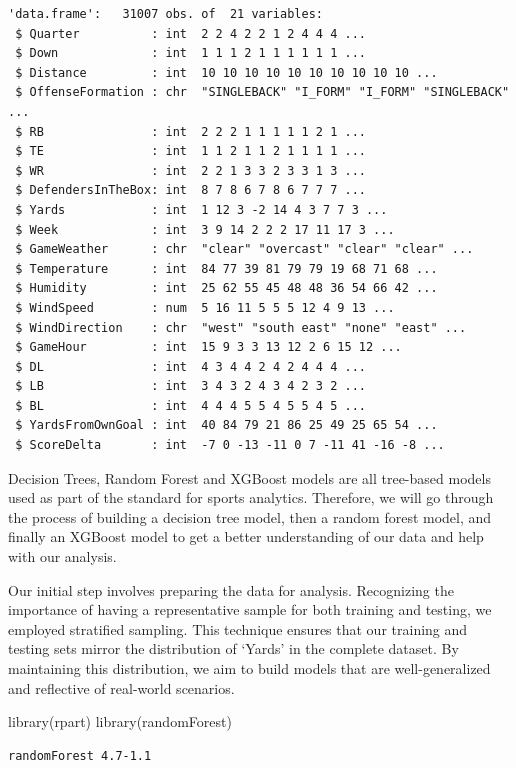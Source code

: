 \documentclass[
  super,
  preprint,
  3p]{elsarticle}
\newenvironment{Shaded}{\begin{snugshade}}{\end{snugshade}}
\newcommand{\FunctionTok}[1]{\textcolor[rgb]{0.28,0.35,0.67}{#1}}
\newcommand{\NormalTok}[1]{\textcolor[rgb]{0.00,0.23,0.31}{#1}}
\begin{document}
\begin{verbatim}
'data.frame':   31007 obs. of  21 variables:
 $ Quarter          : int  2 2 4 2 2 1 2 4 4 4 ...
 $ Down             : int  1 1 1 2 1 1 1 1 1 1 ...
 $ Distance         : int  10 10 10 10 10 10 10 10 10 10 ...
 $ OffenseFormation : chr  "SINGLEBACK" "I_FORM" "I_FORM" "SINGLEBACK" ...
 $ RB               : int  2 2 2 1 1 1 1 1 2 1 ...
 $ TE               : int  1 1 2 1 1 2 1 1 1 1 ...
 $ WR               : int  2 2 1 3 3 2 3 3 1 3 ...
 $ DefendersInTheBox: int  8 7 8 6 7 8 6 7 7 7 ...
 $ Yards            : int  1 12 3 -2 14 4 3 7 7 3 ...
 $ Week             : int  3 9 14 2 2 2 17 11 17 3 ...
 $ GameWeather      : chr  "clear" "overcast" "clear" "clear" ...
 $ Temperature      : int  84 77 39 81 79 79 19 68 71 68 ...
 $ Humidity         : int  25 62 55 45 48 48 36 54 66 42 ...
 $ WindSpeed        : num  5 16 11 5 5 5 12 4 9 13 ...
 $ WindDirection    : chr  "west" "south east" "none" "east" ...
 $ GameHour         : int  15 9 3 3 13 12 2 6 15 12 ...
 $ DL               : int  4 3 4 4 2 4 2 4 4 4 ...
 $ LB               : int  3 4 3 2 4 3 4 2 3 2 ...
 $ BL               : int  4 4 4 5 5 4 5 5 4 5 ...
 $ YardsFromOwnGoal : int  40 84 79 21 86 25 49 25 65 54 ...
 $ ScoreDelta       : int  -7 0 -13 -11 0 7 -11 41 -16 -8 ...
\end{verbatim}

Decision Trees, Random Forest and XGBoost models are all tree-based
models used as part of the standard for sports analytics. Therefore, we
will go through the process of building a decision tree model, then a
random forest model, and finally an XGBoost model to get a better
understanding of our data and help with our analysis.

Our initial step involves preparing the data for analysis. Recognizing
the importance of having a representative sample for both training and
testing, we employed stratified sampling. This technique ensures that
our training and testing sets mirror the distribution of `Yards' in the
complete dataset. By maintaining this distribution, we aim to build
models that are well-generalized and reflective of real-world scenarios.

\begin{Shaded}
\begin{Highlighting}[]
\FunctionTok{library}\NormalTok{(rpart)}
\FunctionTok{library}\NormalTok{(randomForest)}
\end{Highlighting}
\end{Shaded}

\begin{verbatim}
randomForest 4.7-1.1
\end{verbatim}
\end{document}
